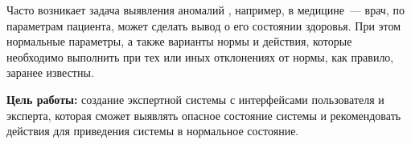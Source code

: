 
Часто возникает задача выявления аномалий \cite{VyyavlenieAnomaliy2020}, например, в медицине~--- врач, по параметрам пациента, может сделать вывод о его состоянии здоровья.
При этом нормальные параметры, а также варианты нормы и действия, которые необходимо выполнить при тех или иных отклонениях от нормы, как правило, заранее известны.

\textbf{Цель работы:} создание экспертной системы с интерфейсами пользователя и эксперта, которая сможет выявлять опасное состояние системы и рекомендовать действия для приведения системы в нормальное состояние.
